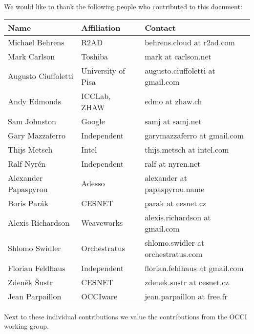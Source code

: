
We would like to thank the following people who contributed to this
document:

\begin{tabular}{l|p{2in}|p{2in}}
Name & Affiliation & Contact \\
\hline
Michael Behrens & R2AD & behrens.cloud at r2ad.com \\
Mark Carlson & Toshiba & mark at carlson.net \\
Augusto Ciuffoletti & University of Pisa & augusto.ciuffoletti at gmail.com\\
Andy Edmonds & ICCLab, ZHAW & edmo at zhaw.ch \\
Sam Johnston & Google & samj at samj.net \\
Gary Mazzaferro & Independent &  garymazzaferro at gmail.com \\
Thijs Metsch & Intel & thijs.metsch at intel.com \\
Ralf Nyrén & Independent & ralf at nyren.net \\
Alexander Papaspyrou & Adesso & alexander at papaspyrou.name \\
Boris Parák & CESNET & parak at cesnet.cz \\
Alexis Richardson & Weaveworks & alexis.richardson at gmail.com \\
Shlomo Swidler & Orchestratus & shlomo.swidler at orchestratus.com \\
Florian Feldhaus & Independent & florian.feldhaus at gmail.com \\
Zden\v{e}k \v{S}ustr & CESNET & zdenek.sustr at cesnet.cz \\
Jean Parpaillon & OCCIware & jean.parpaillon at free.fr \\
\end{tabular}

Next to these individual contributions we value the contributions from
the OCCI working group.
